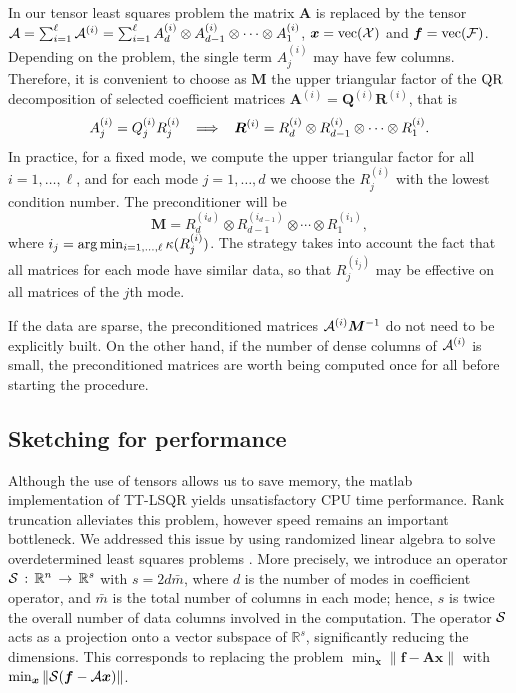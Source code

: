 \documentclass{siamart190516}
\newcommand{\cc}[1]{\mathcal{#1}}
\newcommand{\bx}{\bm x}
\newcommand{\bA}{\bm A}
\newcommand{\cX}{\cc X}
\newcommand{\cF}{\cc F}
\newcommand{\RR}{\mathbb R}
\begin{document}
In our tensor least squares problem the matrix $\bA$ is replaced by the tensor
${\cal \bA} = \sum_{i=1}^{\ell} {\cal \bA}^{(i)} = \sum_{i=1}^{\ell} {A}^{(i)}_d \otimes A^{(i)}_{d-1}\otimes \cdots \otimes A^{(i)}_1$, $\bx = {\rm vec}(\cX)$ and ${\bm f} = {\rm vec}(\cF)$. Depending
on the problem, the single term ${A}^{(i)}_j$ may
have few columns. Therefore, it is convenient to
choose as $\bm M$ the upper triangular factor of the ${\rm QR}$ decomposition of selected coefficient matrices $\bA^{(i)} = {\bm Q}^{(i)} {\bm R}^{(i)}$, that is
\[
A^{(i)}_j = Q^{(i)}_j R^{(i)}_j \hspace{.3cm}\Longrightarrow\hspace{.3cm} {\bm R}^{(i)} = R^{(i)}_d \otimes R^{(i)}_{d-1} \otimes \cdots \otimes R^{(i)}_1. 
\]
In practice, for a fixed mode, we compute the upper triangular factor for all $i=1,\ldots,\ell$, and for each mode $j=1,\ldots,d$ we choose the $R^{(i)}_j$ with the lowest condition number.
%
The preconditioner will be 
\[
{\bm M} = R^{(i_d)}_d\otimes R^{(i_{d-1})}_{d-1} \otimes \cdots \otimes R^{(i_1)}_1,
\]
where %
$i_j = {\rm arg}\min_{i=1,\ldots,\ell} \kappa(R^{(i)}_j)$. The strategy takes into account the fact that all matrices for each mode
have similar data, so that $R^{(i_j)}_j$ may
be effective on all matrices of the $j$th mode.

If the data are sparse, the preconditioned matrices ${\cal \bA}^{(i)} {\bm M}^{-1}$ do not need to be explicitly built. On the other hand,
if the number of dense columns of ${\cal \bA}^{(i)}$ is small, the preconditioned matrices are worth being computed once for all before starting the procedure.  

\subsection{Sketching for performance}\label{sec:sketching}
Although the use of tensors allows us
to save memory, the matlab implementation of TT-LSQR
yields unsatisfactory CPU time performance. 
Rank truncation alleviates this problem, however
speed remains an important bottleneck.
We addressed this issue by using
randomized linear algebra to solve overdetermined
least squares problems \cite{Rokhlin.Tygert.08}.
More precisely,
we introduce an
operator ${\cal S} \, : \, \RR^n \,\to\, \RR^s$
with
$s = 2 d \bar m$, where $d$ is the number of
modes in coefficient operator, and $\bar m$ is the total
number of columns in each mode; hence, $s$ is twice the
overall number of data columns involved in the computation. 
The operator ${\cal S}$ acts as a projection
onto a vector subspace of $\RR^s$, significantly
reducing the dimensions. 
This corresponds to replacing the problem 
$\min_{\bx} \|\bm f - {\mathcal {\bm A}} \bx\|$ with
$\min_{\bx} \|{\cal S} (\bm f - {\mathcal {\bm A}} \bx)\|$.
\end{document}
